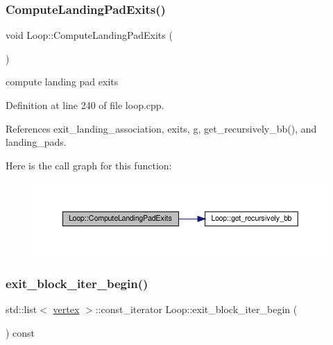 \subsubsection{\texorpdfstring{Compute\+Landing\+Pad\+Exits()}{ComputeLandingPadExits()}}
{\footnotesize\ttfamily void Loop\+::\+Compute\+Landing\+Pad\+Exits (\begin{DoxyParamCaption}{ }\end{DoxyParamCaption})\hspace{0.3cm}{\ttfamily [private]}}



compute landing pad exits 



Definition at line 240 of file loop.\+cpp.



References exit\+\_\+landing\+\_\+association, exits, g, get\+\_\+recursively\+\_\+bb(), and landing\+\_\+pads.

Here is the call graph for this function\+:
\nopagebreak
\begin{figure}[H]
\begin{center}
\leavevmode
\includegraphics[width=350pt]{de/d77/classLoop_a32029bfa844485ff802cb03e18052142_cgraph}
\end{center}
\end{figure}
\mbox{\label{classLoop_ad472be2d5c670602f94e9bf7aba4e814}} 
\subsubsection{\texorpdfstring{exit\+\_\+block\+\_\+iter\+\_\+begin()}{exit\_block\_iter\_begin()}}
{\footnotesize\ttfamily std\+::list$<$ \hyperlink{graph_8hpp_abefdcf0544e601805af44eca032cca14}{vertex} $>$\+::const\+\_\+iterator Loop\+::exit\+\_\+block\+\_\+iter\+\_\+begin (\begin{DoxyParamCaption}{ }\end{DoxyParamCaption}) const}



